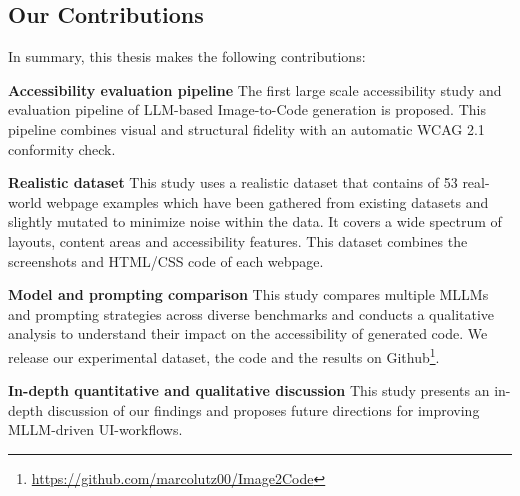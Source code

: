\subsection{Our Contributions}
In summary, this thesis makes the following contributions:

\textbf{Accessibility evaluation pipeline}
The first large scale accessibility study and evaluation pipeline of LLM-based
Image-to-Code generation is proposed. This pipeline combines visual and structural 
fidelity with an automatic WCAG 2.1 conformity check.\newline

\textbf{Realistic dataset}
This study uses a realistic dataset that contains of 53 real-world webpage 
examples which have been gathered from existing datasets and slightly mutated to
minimize noise within the data. It covers a wide spectrum of layouts, content 
areas and accessibility features. This dataset combines the screenshots 
and HTML/CSS code of each webpage.\newline

\textbf{Model and prompting comparison}
This study compares multiple MLLMs and prompting strategies across diverse benchmarks and
conducts a qualitative analysis to understand their impact on the accessibility of generated code.
We release our experimental dataset, the code and the results on 
Github\footnote{\url{https://github.com/marcolutz00/Image2Code}}.\newline

\textbf{In-depth quantitative and qualitative discussion}
This study presents an in-depth discussion of our findings and proposes 
future directions for improving MLLM-driven UI-workflows.






